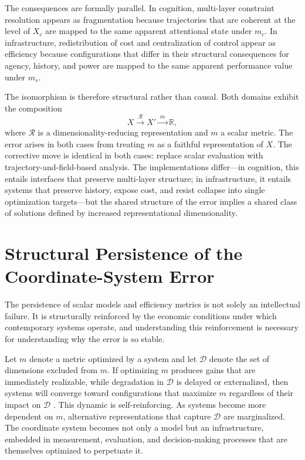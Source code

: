 \documentclass[12pt, a4paper]{article}
\begin{document}
The consequences are formally parallel. In cognition, multi-layer constraint resolution appears as fragmentation because trajectories that are coherent at the level of $X_c$ are mapped to the same apparent attentional state under $m_c$. In infrastructure, redistribution of cost and centralization of control appear as efficiency because configurations that differ in their structural consequences for agency, history, and power are mapped to the same apparent performance value under $m_s$.

The isomorphism is therefore structural rather than causal. Both domains exhibit the composition
\[
X \xrightarrow{\;\mathcal{R}\;} X' \xrightarrow{\;m\;} \mathbb{R},
\]
where $\mathcal{R}$ is a dimensionality-reducing representation and $m$ a scalar metric. The error arises in both cases from treating $m$ as a faithful representation of $X$. The corrective move is identical in both cases: replace scalar evaluation with trajectory-and-field-based analysis. The implementations differ---in cognition, this entails interfaces that preserve multi-layer structure; in infrastructure, it entails systems that preserve history, expose cost, and resist collapse into single optimization targets---but the shared structure of the error implies a shared class of solutions defined by increased representational dimensionality.

\section{Structural Persistence of the Coordinate-System Error}

The persistence of scalar models and efficiency metrics is not solely an intellectual failure. It is structurally reinforced by the economic conditions under which contemporary systems operate, and understanding this reinforcement is necessary for understanding why the error is so stable.

Let $m$ denote a metric optimized by a system and let $\mathcal{D}$ denote the set of dimensions excluded from $m$. If optimizing $m$ produces gains that are immediately realizable, while degradation in $\mathcal{D}$ is delayed or externalized, then systems will converge toward configurations that maximize $m$ regardless of their impact on $\mathcal{D}$ \cite{Goodhart1975}. This dynamic is self-reinforcing. As systems become more dependent on $m$, alternative representations that capture $\mathcal{D}$ are marginalized. The coordinate system becomes not only a model but an infrastructure, embedded in measurement, evaluation, and decision-making processes that are themselves optimized to perpetuate it.
\end{document}
